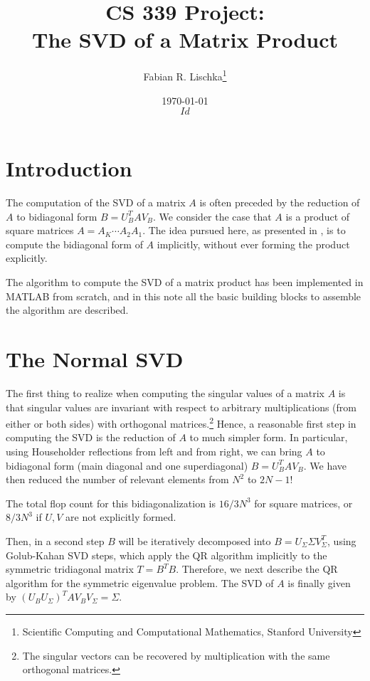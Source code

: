 \documentclass[11pt]{article}
\title{CS 339 Project:\\ The SVD of a Matrix Product}
\author{Fabian R. Lischka\thanks{Scientific Computing and Computational Mathematics, Stanford University}}
\date{\today\\\tiny{$Id$}}
\begin{document}
\lstset{language=Matlab, basicstyle=\footnotesize, numbers=left, numberstyle=\tiny, stepnumber=5, frame=single, columns=flexible, captionpos = b, breaklines=true}

\maketitle
\DeleteShortVerb{\$}
\tableofcontents


\section{Introduction}
The computation of the SVD of a matrix $A$ is often preceded by the reduction of $A$ to bidiagonal form $B = U_B^T A V_B$.  We consider the case that $A$ is a product of square matrices $A=A_K\cdots A_2 A_1$. The idea pursued here, as presented in \cite{587733}, is to compute the bidiagonal form of $A$ implicitly, without ever forming the product explicitly.

The algorithm to compute the SVD of a matrix product has been implemented in MATLAB from scratch, and in this note all the basic building blocks to assemble the algorithm are described. 

\section{The Normal SVD}

The first thing to realize when computing the singular values of a matrix $A$ is that singular values are invariant with respect to arbitrary multiplications (from either or both sides) with orthogonal matrices.\footnote{The singular vectors can be recovered by multiplication with the same orthogonal matrices.} Hence, a reasonable first step in computing the SVD is the reduction of $A$ to much simpler form. In particular, using Householder reflections from left and from right, we can bring $A$ to bidiagonal form (main diagonal and one superdiagonal) $B = U_B^T A V_B$. We have then reduced the number of relevant elements from $N^2$ to $2N-1$! 

The total flop count for this bidiagonalization is $16/3 N^3$ for square matrices, or $8/3 N^3$ if $U,V$ are not explicitly formed.

Then, in a second step $B$ will be iteratively decomposed into $B=U_\Sigma\Sigma V_\Sigma^T$, using Golub-Kahan SVD steps, which apply the QR algorithm implicitly to the symmetric tridiagonal matrix $T=B^TB$. Therefore, we next describe the QR algorithm for the symmetric eigenvalue problem. The SVD of $A$ is finally given by $(U_BU_\Sigma)^T A V_B V_\Sigma = \Sigma$.
\end{document}
